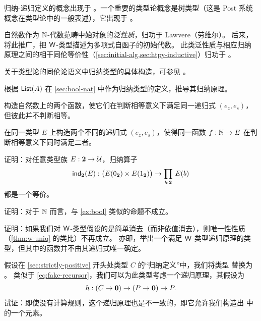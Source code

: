 归纳-递归定义的概念出现于 \cite{Dybjer:2000}。一个重要的类型论概念是树类型（这是 Post 系统概念在类型论中的一般表述），它出现于 \cite{PeterssonSynek}。

自然数作为 $\mathbb{N}$-代数范畴中始对象的\emph{泛性质}，归功于 Lawvere（劳维尔）\cite{lawvere:adjinfound}。
后来，\cite{mp:wftrees} 将此推广，把 $\mathsf{W}$-类型描述为多项式自函子的初始代数。
此类泛性质与相应归纳原理之间的相干同伦等价性（\cref{sec:initial-alg,sec:htpy-inductive}）归功于 \cite{ags:it-hott}。

关于类型论的同伦论语义中归纳类型的具体构造，可参见 \cite{klv:ssetmodel,mvdb:wtypes,ls:hits}。

\sectionExercises

\begin{ex}\label{ex:ind-lst}
  根据 $\mathsf{List}(A)$ 在 \cref{sec:bool-nat} 中作为归纳类型的定义，推导其归纳原理。
\end{ex}

\begin{ex}\label{ex:same-recurrence-not-defeq}
  构造自然数上的两个函数，使它们在判断相等意义下满足同一递归式 $(e_z, e_s)$，但彼此并不判断相等。
\end{ex}

\begin{ex}\label{ex:one-function-two-recurrences}
  在同一类型 $E$ 上构造两个不同的递归式 $(e_z,e_s)$，使得同一函数 $f:\mathbb{N}\to E$ 在判断相等意义下同时满足二者。
\end{ex}

\begin{ex}\label{ex:bool}
  证明：对任意类型族 $E : \mathbf{2} \to \mathcal{U}$，归纳算子
  \[ \ind{\bool}(E) : \big(E(\bfalse) \times E(\btrue)\big) \to \prd{b : \bool} E(b) \]
  都是一个等价。
\end{ex}

\begin{ex}\label{ex:ind-nat-not-equiv}
  证明：对于 $\mathbb{N}$ 而言，与 \cref{ex:bool} 类似的命题不成立。
\end{ex}

\begin{ex}\label{ex:no-dep-uniqueness-failure}
  证明：如果我们对 $\mathsf{W}$-类型假设的是简单消去（而非依值消去），则唯一性性质（\cref{thm:w-uniq} 的类比）不再成立。
  亦即，举出一个满足 $\mathsf{W}$-类型递归原理的类型，但其中的函数并不由其递归式唯一确定。
\end{ex}

\begin{ex}\label{ex:loop}
  假设在 \cref{sec:strictly-positive} 开头处类型 $C$ 的“归纳定义”中，我们将类型 \nat 替换为 \emptyt。
  类似于 \eqref{eq:fake-recursor}，我们可以为此类型考虑一个递归原理，其假设为
  \[ h:(C\to\mathbf{0}) \to (P\to\mathbf{0}) \to P. \]
  试证：即使没有计算规则，这个递归原理也是不一致的，即它允许我们构造出 \emptyt 中的一个元素。
\end{ex}

